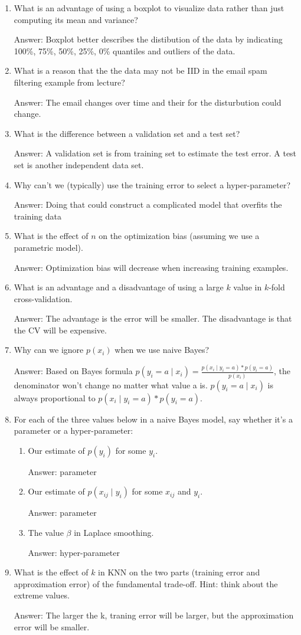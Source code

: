 \documentclass{article}
\def\ans#1{\par\gre{Answer: #1}}
\def\gre#1{{\color{gre}#1}}
\def\cond{\; | \;}
\def\enum#1{\begin{enumerate}#1\end{enumerate}}
\begin{document}
\enum{
\item What is an advantage of using a boxplot to visualize data rather than just computing its mean and variance?
\ans{Boxplot better describes the distibution of the data by indicating 100\%, 75\%, 50\%, 25\%, 0\% quantiles and outliers of the data.}
\item What is a reason that the the data may not be IID in the email spam filtering example from lecture?
\ans{The email changes over time and their for the disturbution could change.}
\item What is the difference between a validation set and a test set?
\ans{A validation set is from training set to estimate the test error. A test set is another independent data set.}
\item Why can't we (typically) use the training error to select a hyper-parameter?
\ans{Doing that could construct a complicated model that overfits the training data}
\item What is the effect of $n$ on the optimization bias (assuming we use a parametric model).
\ans{Optimization bias will decrease when increasing training examples.}
\item What is an advantage and a disadvantage of using a large $k$ value in $k$-fold cross-validation.
\ans{The advantage is the error will be smaller. The disadvantage is that the CV will be expensive.}
\item Why can we ignore $p(x_i)$ when we use naive Bayes?
\ans{Based on Bayes formula
	$p(y_i = a \cond x_i)=
	\frac{p(x_i \cond y_i =a )*p(y_i = a)}{p(x_i)}$, the denominator won't change no matter what value a is. $p(y_i = a \cond x_i)$ is always proportional to $p(x_i \cond y_i =a )*p(y_i = a)$.
}
\item For each of the three values below in a naive Bayes model, say whether it's a parameter or a hyper-parameter:
\begin{enumerate}
\item Our estimate of $p(y_i)$ for some $y_i$.
\ans{parameter}
\item Our estimate of $p(x_{ij} \cond y_i)$ for some $x_{ij}$ and $y_i$.
\ans{parameter}
\item The value $\beta$ in Laplace smoothing.
\ans{hyper-parameter}
\end{enumerate}
\item What is the effect of $k$ in KNN on the two parts (training error and approximation error) of the fundamental trade-off. Hint: think about the extreme values.
\ans{The larger the k, traning error will be larger, but the approximation error will be smaller.}
}
\end{document}
